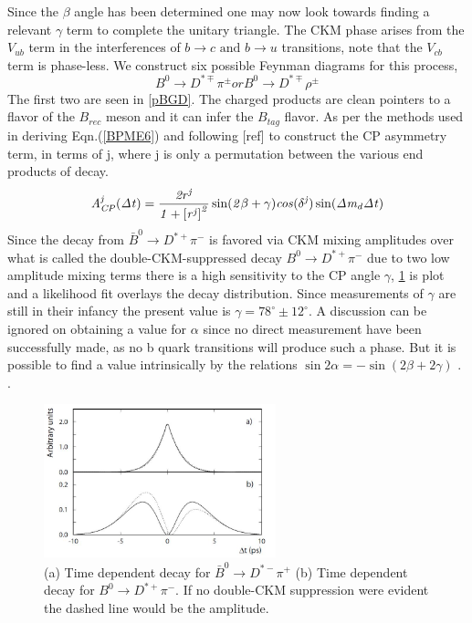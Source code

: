 Since the $\beta$ angle has been determined one may now look towards finding a relevant $\gamma$ term to complete the unitary triangle. The CKM phase arises from the $V_{ub}$ term in the interferences of $b\rightarrow c \mbox{ and } b \rightarrow u$ transitions, note that the $V_{cb}$ term is phase-less. We construct six possible Feynman diagrams for this process,
\begin{equation}\label{BPME22}
B^0 \rightarrow D^{*\mp}\pi^{\pm} or B^0 \rightarrow D^{*\mp}\rho^{\pm} 
\end{equation}
The first two are seen in \cref{pBGD}. The charged products are clean pointers to a flavor of the $B_{rec}$ meson and it can infer the $B_{tag}$ flavor. As per the methods used in deriving Eqn.(\ref{BPME6}) and following [ref] to construct the CP asymmetry term, in terms of j, where j is only a permutation between the various end products of decay.
\begin{equation}\label{BPME23}
\it{A}^{j}_{\it{CP}}(\Delta t) = \frac{2r^j}{1+\left[r^j\right]^2}\sin(2 \beta +\gamma)cos(\delta^j)\sin(\Delta m_d \Delta t)
\end{equation}
Since the decay \cite{B7} from $\bar{B}^0 \rightarrow D^{*+}\pi^{-}$ is favored via CKM mixing amplitudes over what is called the double-CKM-suppressed decay $B^0 \rightarrow D^{*+}\pi^{-}$ due to two low amplitude mixing terms there is a high sensitivity to the CP angle $\gamma$, \ref{kino1} is plot and a likelihood fit overlays the decay distribution. Since measurements of $\gamma$ are still in their infancy the present value is $\gamma = 78^{\circ}\pm12^{\circ}$. A discussion can be ignored on obtaining a value for $\alpha$ since no direct measurement have been successfully made, as no b quark transitions will produce such a phase. But it is possible to find a value intrinsically by the relations $\sin2\alpha = - \sin(2\beta +2\gamma)$ .\cite{B17} .

 \begin{figure}[h]
\centering
\includegraphics[width=0.6\textwidth]{figs/kino.JPG}
\caption{(a) Time dependent decay for $\bar{B}^0 \rightarrow D^{*-}\pi^{+}$ (b) Time dependent decay for $B^0 \rightarrow D^{*+}\pi^{-}$. If no double-CKM suppression were evident the dashed line would be the amplitude.}
\label{kino1}
\end{figure}

